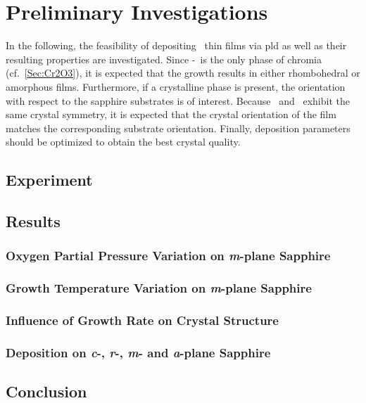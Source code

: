 \section{Preliminary Investigations}
    \label{Sec:Results_Preliminary}
In the following, the feasibility of depositing \cro\ thin films via \gls{pld} as well as their resulting properties are investigated.
Since \textalpha-\cro\ is the only phase of chromia (cf.~\ref{Sec:Cr2O3}), it is expected that the growth results in either rhombohedral or amorphous films.
Furthermore, if a crystalline phase is present, the orientation with respect to the sapphire substrates is of interest.
Because \alo\ and \cro\ exhibit the same crystal symmetry, it is expected that the crystal orientation of the film  matches the corresponding substrate orientation.
Finally, deposition parameters should be optimized to obtain the best crystal quality.

\subsection{Experiment}
    

\subsection{Results}
    \subsubsection{Oxygen Partial Pressure Variation on \textit{m}-plane Sapphire}
        
    \subsubsection{Growth Temperature Variation on \textit{m}-plane Sapphire}
        
    \subsubsection{Influence of Growth Rate on Crystal Structure}
        
    \subsubsection{Deposition on \textit{c}-, \textit{r}-, \textit{m}- and \textit{a}-plane Sapphire}
        

\subsection{Conclusion}
    